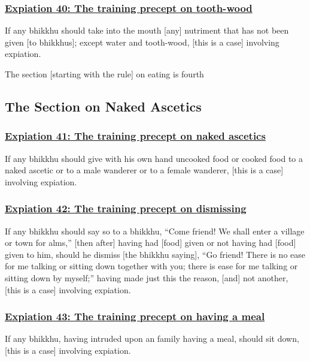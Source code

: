 \subsubsection*{\hyperref[pac40]{Expiation 40: The training precept on tooth-wood}}
\label{exp40}
If any bhikkhu should take into the mouth [any] nutriment that has not been given [to bhikkhus]; except water and tooth-wood, [this is a case] involving expiation.

\begin{center}
	The section [starting with the rule] on eating is fourth
\end{center}



\setsubsecheadstyle{\subsectionFmt}
\subsection{The Section on Naked Ascetics}

\subsubsection*{\hyperref[pac41]{Expiation 41: The training precept on naked ascetics}}
\label{exp41}
If any bhikkhu should give with his own hand uncooked food or cooked food to a naked ascetic or to a male wanderer or to a female wanderer, [this is a case] involving expiation.



\subsubsection*{\hyperref[pac42]{Expiation 42: The training precept on dismissing}}
\label{exp42}
If any bhikkhu should say so to a bhikkhu, ``Come friend! We shall enter a village or town for alms,'' [then after] having had [food] given or not having had [food] given to him, should he dismiss [the bhikkhu saying], ``Go friend! There is no ease for me talking or sitting down together with you; there is ease for me talking or sitting down by myself;'' having made just this the reason, [and] not another, [this is a case] involving expiation.



\subsubsection*{\hyperref[pac43]{Expiation 43: The training precept on having a meal}}
\label{exp43}
If any bhikkhu, having intruded upon an family having a meal, should sit down, [this is a case] involving expiation.



